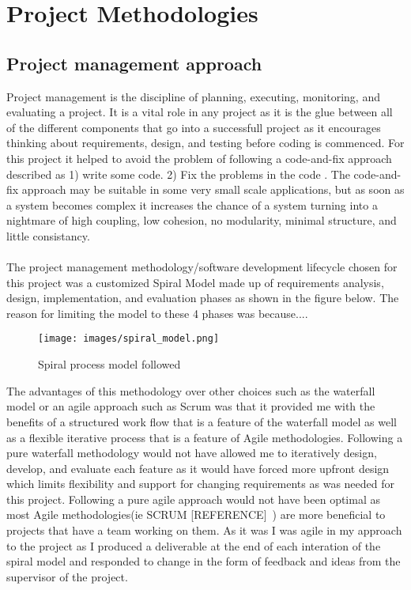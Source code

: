 
\chapter{Project Methodologies}\label{C:m}

\section{Project management approach}
Project management is the discipline of planning, executing, monitoring, and evaluating a project. It is a vital role in any project as it is the glue between all of the different components that go into a successfull project as it encourages thinking about requirements, design, and testing before coding is commenced. For this project it helped to avoid the problem of following a code-and-fix approach described  as 1) write some code. 2) Fix the problems in the code \cite{boehm}. The code-and-fix approach may be suitable in some very small scale applications, but as soon as a system becomes complex it increases the chance of a system turning into a nightmare of high coupling, low cohesion, no modularity, minimal structure, and little consistancy. 
\\\\
The project management methodology/software development lifecycle chosen for this project was a customized Spiral Model made up of requirements analysis, design, implementation, and evaluation phases as shown in the figure below. The reason for limiting the model to these 4 phases was because.... ~
\begin{figure}[h!]
  \centering
      \texttt{[image: images/spiral\_model.png]}
  \caption{Spiral process model followed}
\end{figure}
The advantages of this methodology over other choices such as the waterfall model or an agile approach such as Scrum was that it provided me with the benefits of a structured work flow that is a feature of the waterfall model as well as a flexible iterative process that is a feature of Agile methodologies. Following a pure waterfall methodology would not have allowed me to iteratively design, develop, and evaluate each feature as it would have forced more upfront design which limits flexibility and support for changing requirements as was needed for this project. Following a pure agile approach would not have been optimal as most Agile methodologies(ie SCRUM [REFERENCE]~) are more beneficial to projects that have a team working on them. As it was I was agile in my approach to the project as I produced a deliverable at the end of each interation of the spiral model and responded to change in the form of feedback and ideas from the supervisor of the project.
